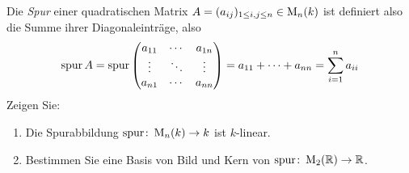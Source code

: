 \begin{question}
 Die \emph{Spur} einer quadratischen Matrix $A = (a_{ij})_{1 \leq i,j \leq n} \in \operatorname{M}_n(k)$ ist definiert also die Summe ihrer Diagonaleinträge, also
 \[
  \operatorname{spur} A
  = \operatorname{spur}
  \begin{pmatrix}
   a_{11} & \cdots & a_{1n} \\
   \vdots & \ddots & \vdots \\
   a_{n1} & \cdots & a_{nn}
  \end{pmatrix}
  = a_{11} + \dotsb + a_{nn}
  = \sum_{i=1}^n a_{ii}
 \]
 Zeigen Sie:
 \begin{enumerate}
  \item
   Die Spurabbildung $\operatorname{spur} \colon \operatorname{M}_n(k) \to k$ ist $k$-linear.
  \item
   Bestimmen Sie eine Basis von Bild und Kern von $\operatorname{spur} \colon \operatorname{M}_2(\mathbb{R}) \to \mathbb{R}$.
 \end{enumerate}
\end{question}
